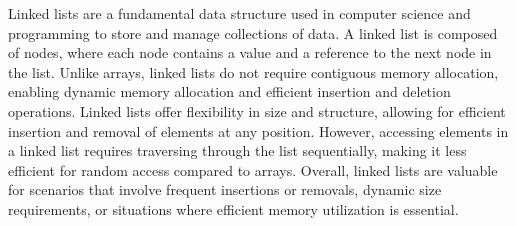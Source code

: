 Linked lists are a fundamental data structure used in computer science and programming to store and manage collections of data. A linked list is composed of nodes, where each node contains a value and a reference to the next node in the list. Unlike 
arrays, linked lists do not require contiguous memory allocation, enabling dynamic memory allocation and efficient insertion and deletion operations. Linked lists offer flexibility in size and structure, allowing for efficient insertion and removal of 
elements at any position. However, accessing elements in a linked list requires traversing through the list sequentially, making it less efficient for random access compared to arrays. Overall, linked lists are valuable for scenarios that involve frequent 
insertions or removals, dynamic size requirements, or situations where efficient memory utilization is essential.

